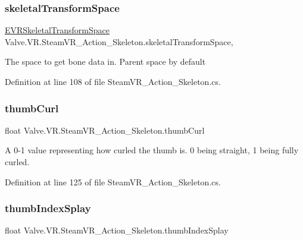 \subsubsection{\texorpdfstring{skeletalTransformSpace}{skeletalTransformSpace}}
{\footnotesize\ttfamily \mbox{\hyperlink{namespace_valve_1_1_v_r_a916744fb3fc7b8e8ba224fba9bee6de4}{E\+V\+R\+Skeletal\+Transform\+Space}} Valve.\+V\+R.\+Steam\+V\+R\+\_\+\+Action\+\_\+\+Skeleton.\+skeletal\+Transform\+Space\hspace{0.3cm}{\ttfamily [get]}, {\ttfamily [set]}}



The space to get bone data in. Parent space by default 



Definition at line 108 of file Steam\+V\+R\+\_\+\+Action\+\_\+\+Skeleton.\+cs.

\mbox{\label{class_valve_1_1_v_r_1_1_steam_v_r___action___skeleton_a920e47de1024d12f1c866a2894fb2e00}} 
\subsubsection{\texorpdfstring{thumbCurl}{thumbCurl}}
{\footnotesize\ttfamily float Valve.\+V\+R.\+Steam\+V\+R\+\_\+\+Action\+\_\+\+Skeleton.\+thumb\+Curl\hspace{0.3cm}{\ttfamily [get]}}



A 0-\/1 value representing how curled the thumb is. 0 being straight, 1 being fully curled. 



Definition at line 125 of file Steam\+V\+R\+\_\+\+Action\+\_\+\+Skeleton.\+cs.

\mbox{\label{class_valve_1_1_v_r_1_1_steam_v_r___action___skeleton_ab7d9b74f2d800ad8cc29e326f01b3b2d}} 
\subsubsection{\texorpdfstring{thumbIndexSplay}{thumbIndexSplay}}
{\footnotesize\ttfamily float Valve.\+V\+R.\+Steam\+V\+R\+\_\+\+Action\+\_\+\+Skeleton.\+thumb\+Index\+Splay\hspace{0.3cm}{\ttfamily [get]}}



